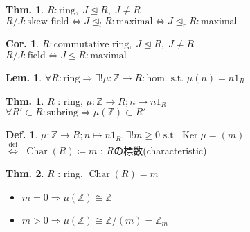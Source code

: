 \documentclass[uplatex,dvipdfmx,9pt]{beamer}
\newcommand{\defarrow}{\overset{\mathrm{def}}{\Leftrightarrow}}
\newcommand{\st}{\text{ s.t. }}
\newcommand{\Char}[1]{\operatorname{Char}(#1)}
\newcommand{\Ker}{\operatorname{Ker}}
\newcommand{\lideal}{\trianglelefteq_l}
\newcommand{\rideal}{\trianglelefteq_r}
\newcommand{\ideal}{\trianglelefteq}
\renewcommand{\hom}{\text{hom.}} %
\newcommand{\Z}{\mathbb{Z}}
\newcounter{textThmCount}
\newcounter{textLemCount}
\theoremstyle{definition} %
\newtheorem{defn}{Def.}[subsection] %
\newtheorem{thm}{Thm.}[subsection] %
\newtheorem{thmText}[textThmCount]{Thm.}
\newtheorem{corText}{Cor.}[textThmCount] %
\newtheorem{lemText}[textLemCount]{Lem.} %
\theoremstyle{example}
\begin{document}
    \begin{frame}
 
      \begin{thmText}
        $R : \text{ring}, \; J \ideal R, \; J \neq R$ \\
        $R/J : \text{skew field} \Leftrightarrow J \lideal R : \text{maximal} \Leftrightarrow J \rideal R : \text{maximal}$
      \end{thmText}

      \begin{corText}
        $R : \text{commutative ring}, \; J \ideal R, \; J \neq R$ \\
        $R/J : \text{field} \Leftrightarrow J \ideal R : \text{maximal}$
      \end{corText}
      
    \end{frame}

    \begin{frame}

      \begin{lemText}
        $\forall R : \text{ring} \Rightarrow \exists! \mu\colon \Z \to R : \hom \st \mu(n) = n1_R$ 
      \end{lemText}

      \begin{thm}
        $R$ : ring, $\mu\colon \Z \to R ; n \mapsto n1_R$ \\
        $\forall R' \subset R : \text{subring} \Rightarrow \mu(\Z) \subset R'$
      \end{thm}

      \begin{defn}
        $\mu\colon \Z \to R ; n \mapsto n1_R, \exists! m \ge 0 \st \Ker\mu = (m)$ \\
        $\defarrow$ $\Char{R} \coloneqq m$ : $R$の\alert{標数(characteristic)}
      \end{defn}

      \begin{thm}
        $R$ : ring, $\Char{R} = m$
        \begin{itemize}
          \item $m = 0 \Rightarrow \mu(\Z) \cong \Z$
          \item $m > 0 \Rightarrow \mu(\Z) \cong \Z/(m) = \Z_m$
        \end{itemize}
      \end{thm}
      
    \end{frame}
\end{document}

